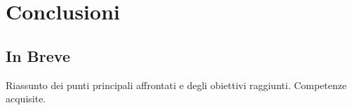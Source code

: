 \chapter{Conclusioni}

\section{In Breve}
Riassunto dei punti principali affrontati e degli obiettivi raggiunti. Competenze acquisite.